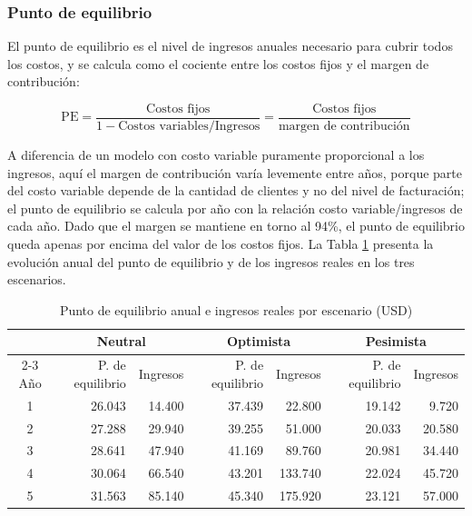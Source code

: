 \subsubsection{Punto de equilibrio}

El punto de equilibrio es el nivel de ingresos anuales necesario para cubrir todos los costos, y se calcula como el cociente entre los costos fijos y el margen de contribución:

\begin{equation*}
\mathrm{PE} = \frac{\text{Costos fijos}}{1 - \text{Costos variables}/\text{Ingresos}} = \frac{\text{Costos fijos}}{\text{margen de contribución}}
\end{equation*}

A diferencia de un modelo con costo variable puramente proporcional a los ingresos, aquí el margen de contribución varía levemente entre años, porque parte del costo variable depende de la cantidad de clientes y no del nivel de facturación; el punto de equilibrio se calcula por año con la relación costo variable/ingresos de cada año. Dado que el margen se mantiene en torno al 94\%, el punto de equilibrio queda apenas por encima del valor de los costos fijos. La Tabla \ref{tab:punto-equilibrio} presenta la evolución anual del punto de equilibrio y de los ingresos reales en los tres escenarios.

\begin{table}[H]
\centering
\footnotesize
\begin{tabular}{c r r r r r r}
\hline
 & \multicolumn{2}{c}{Neutral} & \multicolumn{2}{c}{Optimista} & \multicolumn{2}{c}{Pesimista} \\
\cline{2-3} \cline{4-5} \cline{6-7}
Año & P. de equilibrio & Ingresos & P. de equilibrio & Ingresos & P. de equilibrio & Ingresos \\
\hline
1 & 26.043 & 14.400 & 37.439 & 22.800 & 19.142 & 9.720 \\
2 & 27.288 & 29.940 & 39.255 & 51.000 & 20.033 & 20.580 \\
3 & 28.641 & 47.940 & 41.169 & 89.760 & 20.981 & 34.440 \\
4 & 30.064 & 66.540 & 43.201 & 133.740 & 22.024 & 45.720 \\
5 & 31.563 & 85.140 & 45.340 & 175.920 & 23.121 & 57.000 \\
\hline
\end{tabular}
\caption{Punto de equilibrio anual e ingresos reales por escenario (USD)}
\label{tab:punto-equilibrio}
\end{table}

